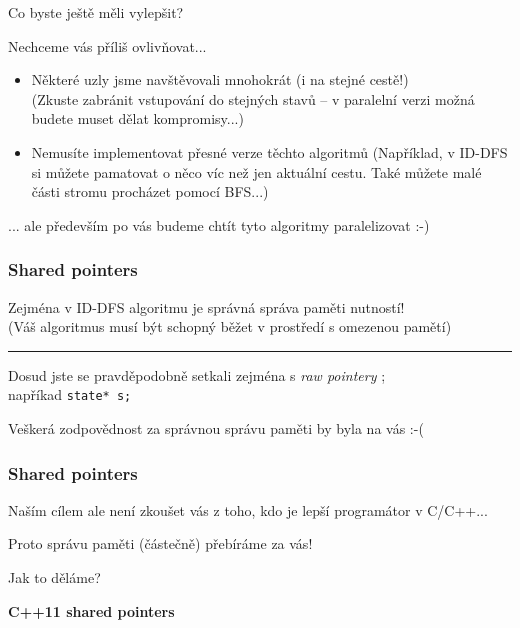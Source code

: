\documentclass[usenames,dvipsnames,9pt]{beamer}
\begin{document}
\begin{frame}
  Co byste ještě měli vylepšit?

  Nechceme vás příliš ovlivňovat...

  \vspace{1em}

  \begin{itemize}
  	\pause\item {\Large Některé uzly jsme navštěvovali mnohokrát (i na stejné cestě!)} \\
  	            (Zkuste zabránit vstupování do stejných stavů -- v paralelní verzi možná budete muset dělat kompromisy...) \\[0.7em]
  	\pause\item {\Large Nemusíte implementovat přesné verze těchto algoritmů}
  				(Například, v ID-DFS si můžete pamatovat o něco víc než jen aktuální cestu. Také můžete malé části stromu procházet pomocí BFS...)
  \end{itemize}

  \pause\vspace{1em}
  ... ale především po vás budeme chtít tyto algoritmy paralelizovat :-)
\end{frame}

\begin{frame}
  \frametitle{Shared pointers}

  {\Large Zejména v ID-DFS algoritmu je správná správa paměti nutností!} \\
  (Váš algoritmus musí být schopný běžet v prostředí s omezenou pamětí)

  \pause
  \vspace{1em}\hrule\vspace{1em}

  Dosud jste se pravděpodobně setkali zejména s \emph{raw pointery} ; \\
  napříkad \texttt{state* s;}

  \pause\vspace{1em}
  \hfill Veškerá zodpovědnost za správnou správu paměti by byla na vás :-(
\end{frame}

\begin{frame}
  \frametitle{Shared pointers}

  Naším cílem ale není zkoušet vás z toho, kdo je lepší programátor v C/C++...

  Proto správu paměti (částečně) přebíráme za vás!

  \hfill {\large Jak to děláme?}

  \pause\vspace{2em}

  \begin{center}
  	\Large\bf C++11 shared pointers
  \end{center}
\end{frame}
\end{document}
